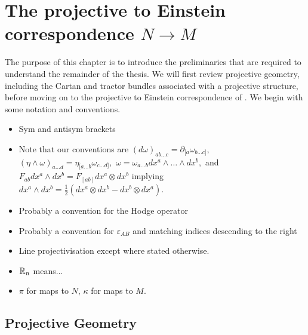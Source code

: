 
\chapter{The projective to Einstein correspondence $N\rightarrow M$}
\label{chap:intro2}

The purpose of this chapter is to introduce the preliminaries that are required to understand the remainder of the thesis. We will first review projective geometry, including the Cartan and tractor bundles associated with a projective structure, before moving on to the projective to Einstein correspondence of \cite{DM}. We begin with some notation and conventions.

\begin{itemize}
\item Sym and antisym brackets
\item Note that our conventions are $(d\omega)_{ab\dots c}=\partial_{[a}\omega_{b\dots c]},$
$(\eta\wedge\omega)_{a\dots d}=\eta_{[a\dots b}\omega_{c\dots d]},$
$\omega=\omega_{a\dots b}dx^{a}\wedge\dots\wedge dx^{b},$
and $F_{ab}{d}x^{a}\wedge{d}x^{b}=F_{[ab]}{d}x^{a}\otimes{d}x^{b}$
implying ${d}x^{a}\wedge{d}x^{b}=\frac{1}{2}({d}x^{a}\otimes{d}x^{b}-{d}x^{b}\otimes{d}x^{a})$.
\item Probably a convention for the Hodge operator
\item Probably a convention for $\varepsilon_{AB}$ and matching indices descending to the right
\item Line projectivisation except where stated otherwise.
\item $\mathbb{R}_n$ means...
\item $\pi$ for maps to $N$, $\kappa$ for maps to $M$.
\end{itemize}


\section{Projective Geometry}\label{sec:projgeom}

